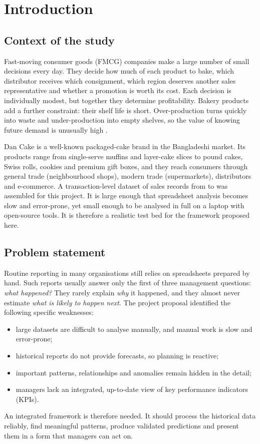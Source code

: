 \chapter{Introduction}\label{ch:intro}

\section{Context of the study}
Fast-moving consumer goods (FMCG) companies make a large number of small decisions every day. They decide how
much of each product to bake, which distributor receives which consignment, which region deserves another
sales representative and whether a promotion is worth its cost. Each decision is individually modest, but
together they determine profitability. Bakery products add a further constraint: their shelf life is short.
Over-production turns quickly into waste and under-production into empty shelves, so the value of knowing
future demand is unusually high \citep{hyndman2021}.

Dan Cake is a well-known packaged-cake brand in the Bangladeshi market. Its products range from single-serve
muffins and layer-cake slices to pound cakes, Swiss rolls, cookies and premium gift boxes, and they reach
consumers through general trade (neighbourhood shops), modern trade (supermarkets), distributors and
e-commerce. A transaction-level dataset of \NRows sales records from \DateMin to \DateMax was assembled for
this project. It is large enough that spreadsheet analysis becomes slow and error-prone, yet small enough to be
analysed in full on a laptop with open-source tools. It is therefore a realistic test bed for the framework
proposed here.

\section{Problem statement}
Routine reporting in many organisations still relies on spreadsheets prepared by hand. Such reports usually
answer only the first of three management questions: \emph{what happened?} They rarely explain \emph{why} it
happened, and they almost never estimate \emph{what is likely to happen next}. The project proposal identified
the following specific weaknesses:
\begin{itemize}
  \item large datasets are difficult to analyse manually, and manual work is slow and error-prone;
  \item historical reports do not provide forecasts, so planning is reactive;
  \item important patterns, relationships and anomalies remain hidden in the detail;
  \item managers lack an integrated, up-to-date view of key performance indicators (KPIs).
\end{itemize}
An integrated framework is therefore needed. It should process the historical data reliably, find meaningful
patterns, produce validated predictions and present them in a form that managers can act on.

